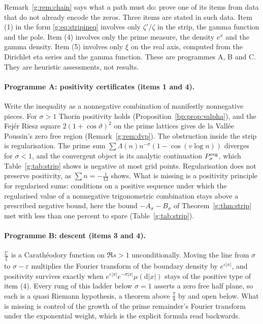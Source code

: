 Remark~\ref{g:rem:chain} says what a path must do: prove one of its items from data that do not already encode the zeros. Three items are stated in such data. Item (1) in the form \eqref{g:eq:stripineq} involves only $\zeta'/\zeta$ in the strip, the gamma function and the pole. Item (4) involves only the prime measure, the density $e^x$ and the gamma density. Item (5) involves only $\xi$ on the real axis, computed from the Dirichlet eta series and the gamma function. These are programmes A, B and C. They are heuristic assessments, not results.

\paragraph{Programme A: positivity certificates (items 1 and 4).} Write the inequality as a nonnegative combination of manifestly nonnegative pieces. For $\sigma>1$ Thorin positivity holds (Proposition~\ref{bp:prop:valpha}), and the Fej\'er Riesz square $2(1+\cos\vartheta)^2$ on the prime lattices gives de la Vall\'ee Poussin's zero free region (Remark~\ref{g:rem:dvp}). The obstruction inside the strip is regularisation. The prime sum $\sum\Lambda(n)n^{-\sigma}(1-\cos(v\log n))$ diverges for $\sigma<1$, and the convergent object is its analytic continuation $P^{\rm reg}_\sigma$, which Table~\ref{g:tab:strip} shows is negative at most grid points. Regularisation does not preserve positivity, as $\sum n=-\frac1{12}$ shows. What is missing is a positivity principle for regularised sums: conditions on a positive sequence under which the regularised value of a nonnegative trigonometric combination stays above a prescribed negative bound, here the bound $-A_\sigma-B_\sigma$ of Theorem~\ref{g:thm:strip} met with less than one percent to spare (Table~\ref{g:tab:strip}).

\paragraph{Programme B: descent (items 3 and 4).} $\frac{\xi'}{\xi}$ is a Carath\'eodory function on $\Re s>1$ unconditionally. Moving the line from $\sigma$ to $\sigma-\varepsilon$ multiplies the Fourier transform of the boundary density by $e^{\varepsilon|x|}$, and positivity survives exactly when $e^{\varepsilon|x|}e^{-\sigma|x|}\mu(\mathrm d|x|)$ stays of the positive type of item (4). %
 Every rung of this ladder below $\sigma=1$ asserts a zero free half plane, so each is a quasi Riemann hypothesis, a theorem above $\frac78$ by \cite{OAI26a} and open below. What is missing is control of the growth of the prime remainder's Fourier transform under the exponential weight, which is the explicit formula read backwards.

